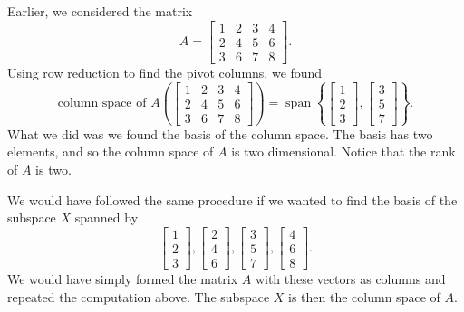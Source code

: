 \documentclass{ximera}
\begin{document}
\begin{example}
    Earlier, we considered the matrix
    \begin{equation*}
        A =
        \begin{bmatrix}
            1 & 2 & 3 & 4 \\
            2 & 4 & 5 & 6 \\
            3 & 6 & 7 & 8
        \end{bmatrix} .
    \end{equation*}
    Using row reduction to find the pivot columns, we found
    \begin{equation*}
        \text{column space of $A$} \left(
        \begin{bmatrix}
            1 & 2 & 3 & 4 \\
            2 & 4 & 5 & 6 \\
            3 & 6 & 7 & 8
        \end{bmatrix} 
        \right)
        = \operatorname{span}
        \left\{
        \begin{bmatrix}
            1 \\
            2 \\
            3 
        \end{bmatrix} 
        ,
        \begin{bmatrix}
            3 \\
            5 \\
            7 
        \end{bmatrix} 
        \right\} .
    \end{equation*}
    What we did was we found the basis of the column space. The basis has two elements, and so the column space of $A$ is two dimensional. Notice that the rank of $A$ is two.
\end{example}

We would have followed the same procedure if we wanted to find the basis of the subspace $X$ spanned by
\begin{equation*}
    \begin{bmatrix}
        1 \\
        2 \\
        3 
    \end{bmatrix} 
    ,
    \begin{bmatrix}
        2 \\
        4 \\
        6 
    \end{bmatrix} 
    ,
    \begin{bmatrix}
        3 \\
        5 \\
        7 
    \end{bmatrix} 
    ,
    \begin{bmatrix}
        4 \\
        6 \\
        8 
    \end{bmatrix}
    .
\end{equation*}
We would have simply formed the matrix $A$ with these vectors as columns and repeated the computation above.  The subspace $X$ is then the column space of $A$.
\end{document}
